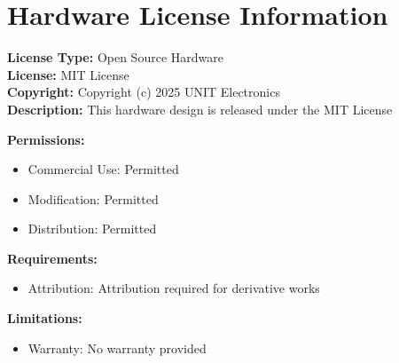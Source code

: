 \documentclass[11pt,a4paper]{article}
\begin{document}

\tableofcontents
\newpage



\listoffigures
\newpage



\listoftables
\newpage





\section*{Hardware License Information}

\begin{tcolorbox}[
    colback=green!5!white,
    colframe=green!50!black,
    title=Open Source Hardware License,
    fonttitle=\bfseries
]

\textbf{License Type:} Open Source Hardware\\[0.2cm]
\textbf{License:} MIT License\\[0.2cm]
\textbf{Copyright:} Copyright (c) 2025 UNIT Electronics\\[0.2cm]

\textbf{Description:} This hardware design is released under the MIT License

\vspace{0.3cm}
\textbf{Permissions:}
\begin{itemize}
    \item Commercial Use: Permitted
    \item Modification: Permitted
    \item Distribution: Permitted
\end{itemize}

\textbf{Requirements:}
\begin{itemize}
    \item Attribution: Attribution required for derivative works
\end{itemize}

\textbf{Limitations:}
\begin{itemize}
    \item Warranty: No warranty provided
\end{itemize}

\end{tcolorbox}
\newpage


\end{document}
